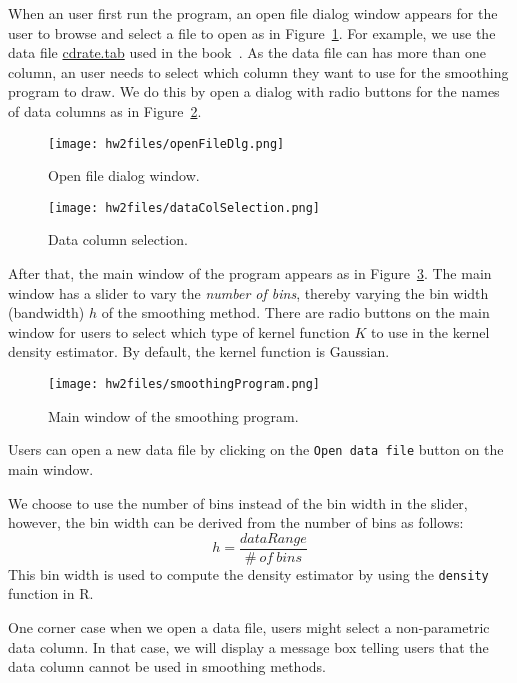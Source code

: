 \documentclass{article}
\begin{document}
 When an user first run the program, an open file dialog window appears for the
 user to browse and select a file to open as in Figure~\ref{fig:openFileDlg}.
 For example, we use the data file
 \href{http://pages.stern.nyu.edu/~jsimonof/SmoothMeth/Data/Tab/cdrate.tab}{cdrate.tab} 
 used in the book~\cite{SimonoffSmoothingTechs}. As the data file can has more
 than one column, an user needs to select which column they want to use for
 the smoothing program to draw. We do this by open a dialog with radio buttons
 for the names of data columns as in Figure~\ref{fig:dataColSelection}.
 
 \begin{figure}[ht!]
\centering
\texttt{[image: hw2files/openFileDlg.png]}
\caption{Open file dialog window.}
\label{fig:openFileDlg}
\end{figure}
 
\begin{figure}[ht!]
\centering
\texttt{[image: hw2files/dataColSelection.png]}
\caption{Data column selection.}
\label{fig:dataColSelection}
\end{figure}
 
 After that, the main window of the program appears as in
 Figure~\ref{fig:smoothingMainWindow}. The main window has a slider to vary the
 \textit{number of bins}, thereby varying the bin width (bandwidth) $h$ of the
 smoothing method. There are radio buttons on the main window for users to
 select which type of kernel function $K$ to use in the kernel density
 estimator. By default, the kernel function is Gaussian.
 
 \begin{figure}[ht!]
\centering
\texttt{[image: hw2files/smoothingProgram.png]}
\caption{Main window of the smoothing program.}
\label{fig:smoothingMainWindow}
\end{figure}

Users can open a new data file by clicking on the \texttt{Open data file}
button on the main window.
 
 We choose to use the number of bins instead of the bin width in the slider,
 however, the bin width can be derived from the number of bins as follows:
 \begin{equation}
 h= \frac{dataRange}{\#\ of\ bins}
 \end{equation}
 This bin width is used to compute the density estimator by using the
 \texttt{density} function in R.
 
 One corner case when we open a data file, users might select a non-parametric
 data column. In that case, we will display a message box telling users that
 the data column cannot be used in smoothing methods.
\end{document}
